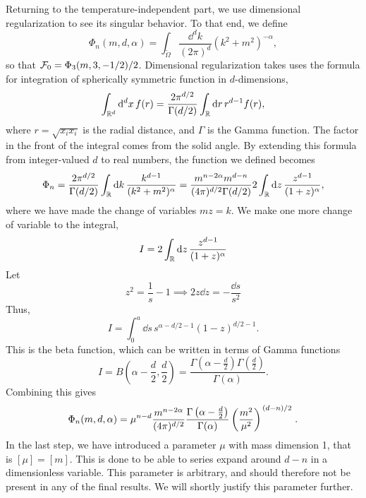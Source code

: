 Returning to the temperature-independent part, we use dimensional regularization to see its singular behavior.
To that end, we define
\begin{equation}
    \label{def dimreg integral}
    \Phi_n(m, d, \alpha) 
    = \int_{\tilde \Omega} \frac{\dd^d k}{(2 \pi)^d} (k^2 + m^2)^{-\alpha},
\end{equation}
so that $\mathcal{F}_0 = \Phi_3(m, 3, -1/2) / 2$.
Dimensional regularization takes uses the formula for integration of spherically symmetric function in $d$-dimensions,
\begin{equation}
    \int_{\mathbb{R}^d} \dd^d x \, f(r) 
    = \frac{2 \pi^{d/2}}{\Gamma(d/2)} \int_{\mathbb{R}} \dd r \, r^{d-1}f(r),
\end{equation}
where $r = \sqrt{x_i x_i}$ is the radial distance, and $\Gamma$ is the Gamma function.
The factor in the front of the integral comes from the solid angle.
By extending this formula from integer-valued $d$ to real numbers, the function we defined becomes
\begin{equation}
    \Phi_n
    = \frac{2 \pi^{d/2} }{\Gamma(d/2)} \int_{\mathbb{R}} \dd k \, 
    \frac{k^{d-1}}{(k^2 + m^2)^\alpha}
    = \frac{m^{n-2\alpha}m^{d-n} }{(4 \pi)^{d / 2}\Gamma(d/2)} 
    2 \int_{\mathbb{R}} \dd z \, \frac{z^{d - 1}}{(1 + z)^\alpha}, 
\end{equation}
where we have made the change of variables $m z = k$.
We make one more change of variable to the integral,
\begin{equation}
    I = 2 \int_{\mathbb{R}} \dd z \, \frac{z^{d - 1}}{(1 + z)^\alpha}
\end{equation}
Let
\begin{equation}
    z^2 = \frac{1}{s} - 1 \implies 2 z \dd z = - \frac{\dd s}{s^2}
\end{equation}
Thus,
\begin{equation}
    I = \int_0^a \dd s \, s^{\alpha - d/2 - 1} (1 - z)^{d/2 - 1}.
\end{equation}
This is the beta function, which can be written in terms of Gamma functions~\cite{Peskin:IntroQFT}
\begin{equation}
    I = B\left(\alpha - \frac{d}{2}, \frac{d}{2}\right) 
    = \frac{\Gamma\left(\alpha - \frac{d}{2}\right) \Gamma\left(\frac{d}{2}\right)}{\Gamma(\alpha)}.
\end{equation}
Combining this gives
\begin{equation}
    \label{result dimreg}
    \Phi_n(m, d, \alpha) 
    = \mu^{n-d} \frac{m^{n - 2\alpha}}{(4 \pi)^{d / 2}}
    \frac{
        \Gamma \left(\alpha - \frac{d}{2} \right) 
    }
    {\Gamma(\alpha)}
    \left(\frac{m^2}{\mu^2}\right)^{\flatfrac{(d-n)}{2}} 
    .
\end{equation}
In the last step, we have introduced a parameter $\mu$ with mass dimension 1, that is $[\mu] = [m]$.
This is done to be able to series expand around $d - n$ in a dimensionless variable. 
This parameter is arbitrary, and should therefore not be present in any of the final results.
We will shortly justify this parameter further.


